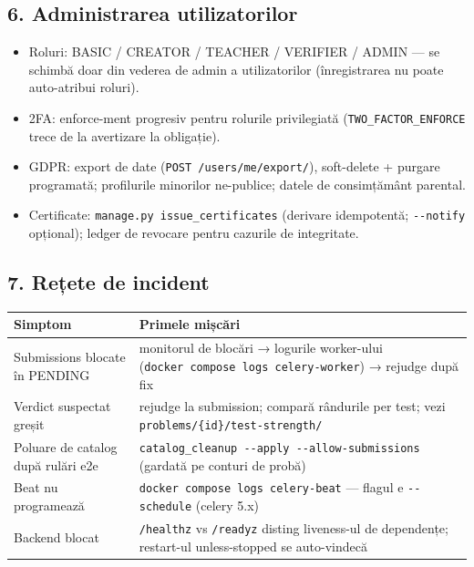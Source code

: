 \documentclass[
]{article}
\newcounter{none} %
\providecommand{\tightlist}{%
  \setlength{\itemsep}{0pt}\setlength{\parskip}{0pt}}
\begin{document}
\subsection{6. Administrarea
utilizatorilor}\label{6-administrarea-utilizatorilor}

\begin{itemize}
\tightlist
\item
  Roluri: BASIC / CREATOR / TEACHER / VERIFIER / ADMIN --- se schimbă
  doar din vederea de admin a utilizatorilor (înregistrarea nu poate
  auto-atribui roluri).
\item
  2FA: enforce-ment progresiv pentru rolurile privilegiată
  (\texttt{TWO\_FACTOR\_ENFORCE} trece de la avertizare la obligație).
\item
  GDPR: export de date (\texttt{POST\ /users/me/export/}), soft-delete +
  purgare programată; profilurile minorilor ne-publice; datele de
  consimțământ parental.
\item
  Certificate: \texttt{manage.py\ issue\_certificates} (derivare
  idempotentă; \texttt{-\/-notify} opțional); ledger de revocare pentru
  cazurile de integritate.
\end{itemize}

\subsection{7. Rețete de incident}\label{7-reux21bete-de-incident}

{\def\LTcaptype{none} %
\begin{longtable}[]{@{}ll@{}}
\toprule\noalign{}
Simptom & Primele mișcări \\
\midrule\noalign{}
\endhead
\bottomrule\noalign{}
\endlastfoot
Submissions blocate în PENDING & monitorul de blocări → logurile
worker-ului (\texttt{docker\ compose\ logs\ celery-worker}) → rejudge
după fix \\
Verdict suspectat greșit & rejudge la submission; compară rândurile per
test; vezi \texttt{problems/\{id\}/test-strength/} \\
Poluare de catalog după rulări e2e &
\texttt{catalog\_cleanup\ -\/-apply\ -\/-allow-submissions} (gardată pe
conturi de probă) \\
Beat nu programează & \texttt{docker\ compose\ logs\ celery-beat} ---
flagul e \texttt{-\/-schedule} (celery 5.x) \\
Backend blocat & \texttt{/healthz} vs \texttt{/readyz} disting
liveness-ul de dependențe; restart-ul unless-stopped se auto-vindecă \\
\end{longtable}
}
\end{document}
